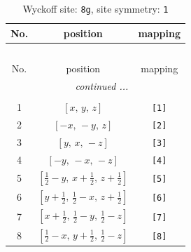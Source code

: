 \documentclass[fleqn,8pt]{jsarticle}
\begin{document}
\renewcommand{\arraystretch}{1.2}
\begin{longtable}{ccc}
\caption{Wyckoff site: {\tt 8g}, site symmetry: {\tt 1}}
 \\
 \hline \hline
No. & position & mapping \\ \hline \endfirsthead

\multicolumn{2}{l}{\tablename\ \thetable{}} \\
 \hline \hline
No. & position & mapping \\ \hline \endhead

 \hline \hline
\multicolumn{2}{r}{\footnotesize\it continued ...} \\ \endfoot

 \hline \hline
\multicolumn{2}{r}{} \\ \endlastfoot

1 & $\left[ x,\, y,\, z \right]$ & {\tt [1]} \\ \hline
2 & $\left[ - x,\, - y,\, z \right]$ & {\tt [2]} \\ \hline
3 & $\left[ y,\, x,\, - z \right]$ & {\tt [3]} \\ \hline
4 & $\left[ - y,\, - x,\, - z \right]$ & {\tt [4]} \\ \hline
5 & $\left[ \frac{1}{2} - y,\, x + \frac{1}{2},\, z + \frac{1}{2} \right]$ & {\tt [5]} \\ \hline
6 & $\left[ y + \frac{1}{2},\, \frac{1}{2} - x,\, z + \frac{1}{2} \right]$ & {\tt [6]} \\ \hline
7 & $\left[ x + \frac{1}{2},\, \frac{1}{2} - y,\, \frac{1}{2} - z \right]$ & {\tt [7]} \\ \hline
8 & $\left[ \frac{1}{2} - x,\, y + \frac{1}{2},\, \frac{1}{2} - z \right]$ & {\tt [8]} \\
\end{longtable}
\end{document}
